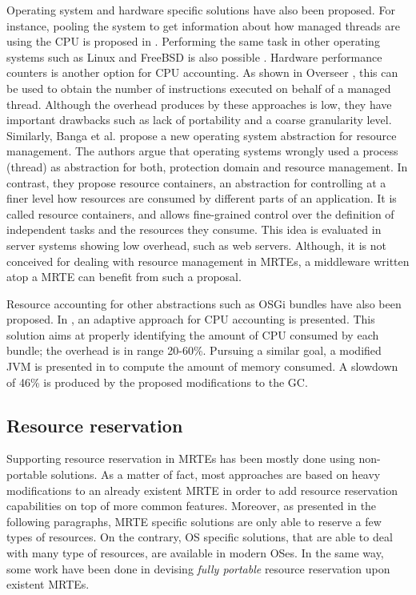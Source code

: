 Operating system and hardware specific solutions have also been proposed.
For instance, pooling the system to get information about how managed threads are using the CPU is proposed in \cite{czajkowski_jres:_1998}.
Performing the same task in other operating systems such as Linux and FreeBSD is also possible \cite{Soltesz:2007:COS:1272998.1273025, Kamp00jails:confining}.
Hardware performance counters is another option for CPU accounting.
As shown in Overseer \cite{DBLP:conf/pppj/PeternierBBP11}, this can be used to obtain the number of instructions executed on behalf of a managed thread.
Although the overhead produces by these approaches is low, they have important drawbacks such as lack of portability and a coarse granularity level.
Similarly, Banga et al. \cite{Banga:1999:RCN:296806.296810} propose a new operating system abstraction for resource management.
The authors argue that operating systems wrongly used a process (thread) as abstraction for both, protection domain and resource management.
In contrast, they propose resource containers, an abstraction for controlling at a finer level how resources are consumed by different parts of an application.
It is called resource containers, and allows fine-grained control over the definition of independent tasks and the resources they consume.
This idea is evaluated in server systems showing low overhead, such as web servers.
Although, it is not conceived for dealing with resource management in MRTEs, a middleware written atop a MRTE can benefit from such a proposal.

Resource accounting for other abstractions such as OSGi bundles have also been proposed.
In \cite{Maurel:2012:AME:2304736.2304763}, an adaptive approach for CPU accounting is presented.
This solution aims at properly identifying the amount of CPU consumed by each bundle; the overhead is in range 20-60\%.
Pursuing a similar goal, a modified JVM is presented in \cite{Attouchi:2014:MMM:2602458.2602467} to compute the amount of memory consumed.
A slowdown of 46\% is produced by the proposed modifications to the GC.

\subsection{Resource reservation} \label{sec:resource-reservation-related}

Supporting resource reservation in MRTEs has been mostly done using non-portable solutions.
As a matter of fact, most approaches are based on heavy modifications to an already existent MRTE in order to add resource reservation capabilities on top of more common features.
Moreover, as presented in the following paragraphs, MRTE specific solutions are only able to reserve a few types of resources.
On the contrary, OS specific solutions, that are able to deal with many type of resources, are available in modern OSes.
In the same way, some work have been done in devising \textit{fully portable} resource reservation upon existent MRTEs.

